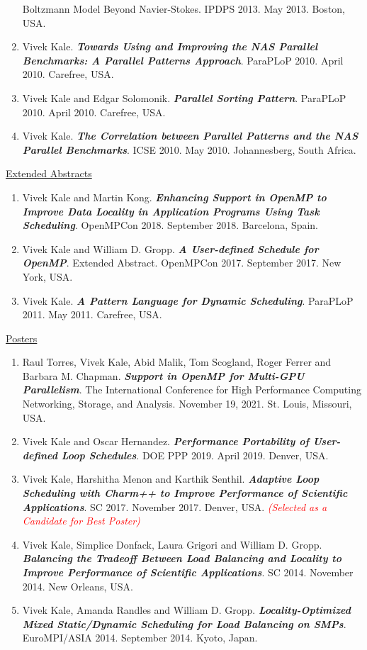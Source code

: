 \begin{enumerate}
{{Boltzmann Model Beyond Navier-Stokes}}. IPDPS 2013. May 2013. Boston, USA.
\item Vivek Kale. \textbf{\textit{Towards Using and Improving the NAS Parallel Benchmarks: A Parallel Patterns Approach}}. ParaPLoP 2010. April 2010. Carefree, USA.
\item Vivek Kale and Edgar Solomonik. \textbf{\textit{Parallel Sorting Pattern}}. ParaPLoP 2010. April 2010. Carefree, USA. 
\item Vivek Kale. \textbf{\textit{The Correlation between Parallel Patterns and the NAS Parallel Benchmarks}}. ICSE 2010. May 2010. Johannesberg, South Africa.
\end{enumerate} 

\underline{Extended Abstracts}
\begin{enumerate}
\item Vivek Kale and Martin Kong. \textbf{\textit{Enhancing Support in OpenMP to Improve Data Locality in Application Programs Using Task Scheduling}}. OpenMPCon 2018. September 2018. Barcelona, Spain.
\item Vivek Kale and William D. Gropp. \textbf{\textit{A User-defined Schedule for OpenMP}}. Extended Abstract. OpenMPCon
  2017. September 2017. New York, USA.
\item Vivek Kale. \textbf{\textit{A Pattern Language for Dynamic Scheduling}}. ParaPLoP 2011. May 2011. Carefree, USA.
\end{enumerate}

\underline{Posters}
\begin{enumerate}
\item Raul Torres, Vivek Kale, Abid Malik, Tom Scogland, Roger Ferrer and Barbara M. Chapman. \textbf{\textit{Support in OpenMP for Multi-GPU Parallelism}}. The International Conference for High Performance Computing Networking, Storage, and Analysis. November 19, 2021. St. Louis, Missouri, USA.
\item Vivek Kale and Oscar Hernandez. {\bf\textit{Performance Portability of User-defined Loop Schedules}}. DOE PPP 2019. April 2019. Denver, USA.
\item Vivek Kale, Harshitha Menon and Karthik Senthil. \textbf{\textit{Adaptive Loop Scheduling with Charm++ to Improve Performance of Scientific Applications}}. SC 2017. November 2017. Denver, USA. \textit{\textcolor{red}{(Selected as a Candidate for Best Poster)}}
\item Vivek Kale, Simplice Donfack, Laura Grigori and William D. Gropp. \textbf{\textit{Balancing the Tradeoff Between Load Balancing and Locality to Improve Performance of Scientific Applications}}. SC 2014. November 2014. New Orleans, USA.
\item Vivek Kale, Amanda Randles and William D. Gropp. \textbf{\textit{Locality-Optimized Mixed Static/Dynamic
      Scheduling for Load Balancing on SMPs}}. EuroMPI/ASIA 2014. September 2014. Kyoto, Japan.
\end{enumerate}



